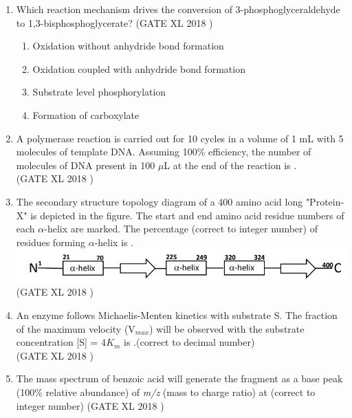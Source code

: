 \documentclass[14pt]{extarticle}
\begin{document}
\begin{flushleft}
\begin{enumerate}[leftmargin=*]
\item Which reaction mechanism drives the conversion of 3-phosphoglyceraldehyde to 1,3-bisphosphoglycerate?
\hfill(GATE XL 2018 )\\

\begin{enumerate}[label=(\Alph*)]
    \item Oxidation without anhydride bond formation
    \item Oxidation coupled with anhydride bond formation
    \item Substrate level phosphorylation
    \item Formation of carboxylate
\end{enumerate}


\item A polymerase reaction is carried out for 10 cycles in a volume of 1 mL with 5 molecules of template DNA. Assuming 100\% efficiency, the number of molecules of DNA present in 100 $\mu$L at the end of the reaction is \underline{\hspace{2cm}}.\\
\hfill(GATE XL 2018 )

\item The secondary structure topology diagram of a 400 amino acid long "Protein-X" is depicted in the figure. The start and end amino acid residue numbers of each $\alpha$-helix are marked. The percentage (correct to integer number) of residues forming $\alpha$-helix is \underline{\hspace{2cm}}.
\includegraphics[scale=0.8]{fig21.png}\\
\hfill(GATE XL 2018 )


\item An enzyme follows Michaelis-Menten kinetics with substrate S. The fraction of the maximum velocity (V$_{max}$) will be observed with the substrate concentration [S] = 4$K_m$ is \underline{\hspace{2cm}}.(correct to decimal number)\\
\hfill(GATE XL 2018 )\\


\item The mass spectrum of benzoic acid will generate the fragment as a base peak (100\% relative abundance) of \textit{m/z} (mass to charge ratio) at \underline{\hspace{3cm}}
(correct to integer number)
\hfill(GATE XL 2018 )\\




\end{enumerate}
\end{flushleft}
\end{document}
